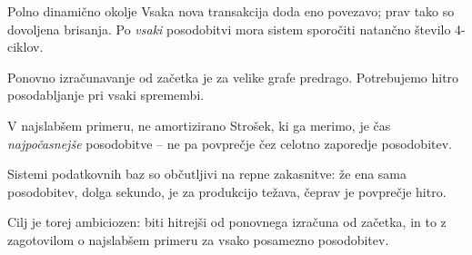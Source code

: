 \documentclass[aspectratio=169,10pt]{beamer}
\begin{document}
\begin{frame}{Polno dinamično okolje}
  Vsaka nova transakcija doda eno povezavo; prav tako so dovoljena brisanja. Po \emph{vsaki} posodobitvi mora sistem sporočiti natančno število 4-ciklov.

  \vspace{0.6em}
  Ponovno izračunavanje od začetka je za velike grafe predrago. Potrebujemo hitro posodabljanje pri vsaki spremembi.

  \vspace{0.6em}
  \begin{block}{V najslabšem primeru, ne amortizirano}
    Strošek, ki ga merimo, je čas \emph{najpočasnejše} posodobitve -- ne pa povprečje čez celotno zaporedje posodobitev.

    \medskip
    Sistemi podatkovnih baz so občutljivi na repne zakasnitve: že ena sama posodobitev, dolga sekundo, je za produkcijo težava, čeprav je povprečje hitro.
  \end{block}

  \vspace{0.6em}
  Cilj je torej ambiciozen: biti hitrejši od ponovnega izračuna od začetka, in to z zagotovilom o najslabšem primeru za vsako posamezno posodobitev.
\end{frame}

\end{document}
